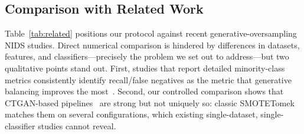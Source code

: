 ﻿\documentclass[journal]{IEEEtran}
\begin{document}
\subsection{Comparison with Related Work}
Table~\ref{tab:related} positions our protocol against recent generative-oversampling NIDS studies. Direct numerical comparison is hindered by differences in datasets, features, and classifiers---precisely the problem we set out to address---but two qualitative points stand out. First, studies that report detailed minority-class metrics consistently identify recall/false negatives as the metric that generative balancing improves the most~\cite{he2023cwvaegan,yang2025cegan,babu2023mcgan}. Second, our controlled comparison shows that CTGAN-based pipelines~\cite{zha2025anids,soflaei2024dualctgan,habibi2023ctgan} are strong but not uniquely so: classic SMOTETomek matches them on several configurations, which existing single-dataset, single-classifier studies cannot reveal.
\end{document}
